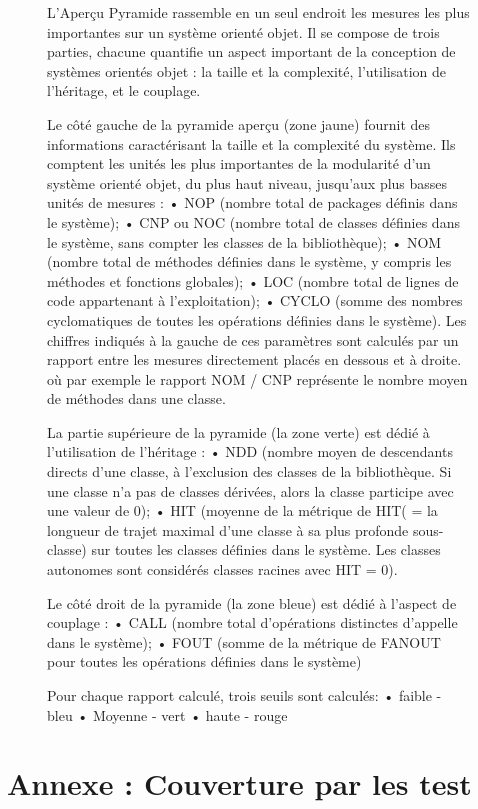 \documentclass[12pt,a4paper,final]{article}
\begin{document}
\begin{figure}[ht]\label{pyramidLeg}
L'Aperçu Pyramide rassemble en un seul endroit les mesures les plus importantes sur un système orienté objet. Il se compose de trois parties, chacune quantifie un aspect important de la conception de systèmes orientés objet : la taille et la complexité, l'utilisation de l'héritage, et le couplage.

Le côté gauche de la pyramide aperçu (zone jaune) fournit des informations caractérisant la taille et la complexité du système. Ils comptent les unités les plus importantes de la modularité d'un système orienté objet, du plus haut niveau, jusqu'aux plus basses unités de mesures : 
• NOP (nombre total de packages définis dans le système);
• CNP ou NOC (nombre total de classes définies dans le système, sans compter les classes de la bibliothèque);
• NOM (nombre total de méthodes définies dans le système, y compris les méthodes et fonctions globales);
• LOC (nombre total de lignes de code appartenant à l'exploitation);
• CYCLO (somme des nombres cyclomatiques de toutes les opérations définies dans le système).
Les chiffres indiqués à la gauche de ces paramètres sont calculés par un rapport entre les mesures directement placés en dessous et à droite. où par exemple le rapport NOM / CNP représente le nombre moyen de méthodes dans une classe.

La partie supérieure de la pyramide (la zone verte) est dédié à l'utilisation de l'héritage : 
• NDD (nombre moyen de descendants directs d'une classe, à l'exclusion des classes de la bibliothèque. Si une classe n'a pas de classes dérivées, alors la classe participe avec une valeur de 0);
• HIT (moyenne de la métrique de HIT( = la longueur de trajet maximal d'une classe à sa plus profonde sous-classe) sur toutes les classes définies dans le système. Les classes autonomes sont considérés classes racines avec HIT = 0).

Le côté droit de la pyramide (la zone bleue) est dédié à l'aspect de couplage :
• CALL (nombre total d'opérations distinctes d'appelle dans le système);
• FOUT (somme de la métrique de FANOUT pour toutes les opérations définies dans le système)

Pour chaque rapport calculé, trois seuils sont calculés:
• faible - bleu
• Moyenne - vert
• haute - rouge
\end{figure}

\clearpage
\newpage
\section{Annexe : Couverture par les test}\label{coverage}
\end{document}
